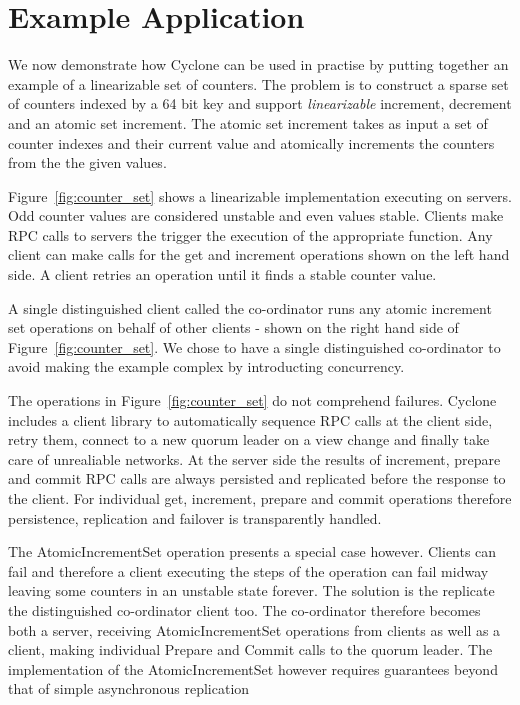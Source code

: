 \documentclass[twocolumn]{article}
\begin{document}
\section{Example Application}
\label{sec:examples}
We now demonstrate how Cyclone can be used in practise by putting together an
example of a linearizable set of counters. The problem is to construct a sparse
set of counters indexed by a 64 bit key and support \emph{linearizable}
increment, decrement and an atomic set increment. The atomic set increment takes
as input a set of counter indexes and their current value and atomically
increments the counters from the the given values. 

Figure~\ref{fig:counter_set} shows a linearizable implementation executing on
servers. Odd counter values are considered unstable and even values stable.
Clients make RPC calls to servers the trigger the execution of the
appropriate function. Any client can make calls for the get and increment
operations shown on the left hand side. A client retries an operation until it
finds a stable counter value.

A single distinguished client called the co-ordinator runs any atomic increment
set operations on behalf of other clients - shown on the right hand side of
Figure~\ref{fig:counter_set}. We chose to have a single
distinguished co-ordinator to avoid making the example complex by introducting
concurrency.

The operations in Figure~\ref{fig:counter_set} do not comprehend failures.
Cyclone includes a client library to automatically sequence RPC calls at the client
side, retry them, connect to a new quorum leader on a view change and finally
take care of unrealiable networks. At the server side the results of increment,
prepare and commit RPC calls are always persisted and replicated before the
response to the client. For individual get, increment, prepare and commit
operations therefore persistence, replication and failover is transparently
handled.

The AtomicIncrementSet operation presents a special case however. Clients can
fail and therefore a client executing the steps of the operation can fail midway
leaving some counters in an unstable state forever. The solution is the
replicate the distinguished co-ordinator client too. The co-ordinator therefore
becomes both a server, receiving AtomicIncrementSet operations from clients as
well as a client, making individual Prepare and Commit calls to the quorum
leader. The implementation of the AtomicIncrementSet however requires guarantees
beyond that of simple asynchronous replication
\end{document}
